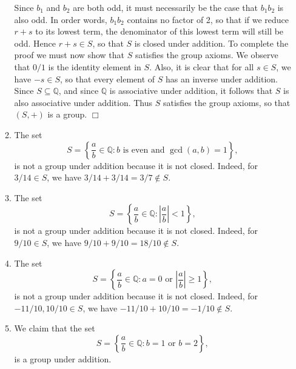 \documentclass[9pt]{article}
\newcommand{\qed}{\hfill \ensuremath{\Box}}
\newcommand{\Q}{\mathbb{Q}}
\begin{document}
\begin{enumerate}
\begin{enumerate}
               Since $b_1$ and $b_2$ are both odd, it must necessarily be the 
               case that $b_1b_2$ is also odd. In order words, $b_1b_2$ contains 
               no factor of 2, so that if we reduce $r + s$ to its lowest term, 
               the denominator of this lowest term will still be odd. Hence
               $r + s \in S$, so that $S$ is closed under addition. To complete 
               the proof we must now show that $S$ satisfies the group axioms. 
               We observe that $0/1$ is the identity element in $S$. Also, it is 
               clear that for all $s \in S$, we have $-s \in S$, so that every 
               element of $S$ has an inverse under addition. Since
               $S \subseteq \Q$, and since $\Q$ is associative under addition, 
               it follows that $S$ is also associative under addition. Thus $S$ 
               satisfies the group axioms, so that $(S, +)$ is a group. \qed
         \item The set
               $$S = \left\{\frac{a}{b} \in \Q : b \text{ is even} \text{ and }
                 \gcd(a, b) = 1\right\},$$
               is not a group under addition because it is not closed. Indeed,
               for $3/14 \in S$, we have $3/14 + 3/14 = 3/7 \notin S$.
         \item The set
               $$S = \left\{\frac{a}{b} \in \Q :
                     \left|\frac{a}{b}\right| < 1\right\},$$
               is not a group under addition because it is not closed. Indeed,
               for $9/10 \in S$, we have $9/10 + 9/10 = 18/10 \notin S$.
         \item The set
               $$S = \left\{\frac{a}{b} \in \Q : a = 0 \text{ or }
                     \left|\frac{a}{b}\right| \ge 1\right\},$$
               is not a group under addition because it is not closed. Indeed,
               for $-11/10, 10/10 \in S$, we have
               $-11/10 + 10/10 = -1/10 \notin S$.
         \item We claim that the set
               $$S = \left\{\frac{a}{b} \in \Q : b = 1 \text{ or }
                 b = 2\right\},$$
               is a group under addition.


\end{enumerate}
\end{enumerate}
\end{document}
